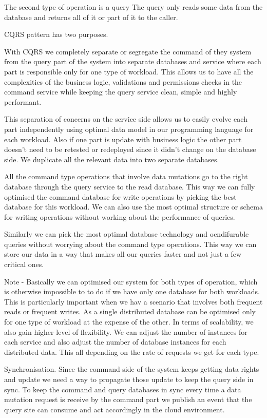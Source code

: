 The second type of operation is a query
The query only reads some data from the database and returns all of it or part of it to the caller.

CQRS pattern has two purposes.

With CQRS we completely separate or segregate the command of they system from the query part of the system into separate databases and service where each part is responsible only for one type of workload.
This allows us to have all the complexities of the business logic, validations and permissions checks in the command service while keeping the query service clean, simple and highly performant.

This separation of concerns on the service side allows us to easily evolve each part independently using optimal data model in our programming language for each workload.
Also if one part is update with business logic the other part doesn't need to be retested or redeployed since it didn't change on the database side.
We duplicate all the relevant data into two separate databases.

All the command type operations that involve data mutations go to the right database through the query service to the read database.
This way we can fully optimised the command database for write operations by picking the best database for this workload.
We can also use the most optimal structure or schema for writing operations without working about the performance of queries.

Similarly we can pick the most optimal database technology and ocndifurable queries without worrying about the command type operations.
This way we can store our data in a way that makes all our queries faster and not just a few critical ones.

Note - Basically we can optimised our system for both types of operation, which is otherwise impossible to to do if we have only one database for both workloads.
This is particularly important when we hav a scenario that involves both frequent reads or frequent writes.
As a single distributed database can be optimised only for one type of workload at the expense of the other.
In terms of scalability, we also gain higher level of flexibility.
We can adjust the number of instances for each service and also adjust the number of database instances for each distributed data.
This all depending on the rate of requests we get for each type.

Synchronisation.
Since the command side of the system keeps getting data rights and update we need a way to propagate those update to keep the query side in sync.
To keep the command and query databases in sync every time a data mutation request is receive by the command part we publish an event that the query site can consume and act accordingly in the cloud environment.

